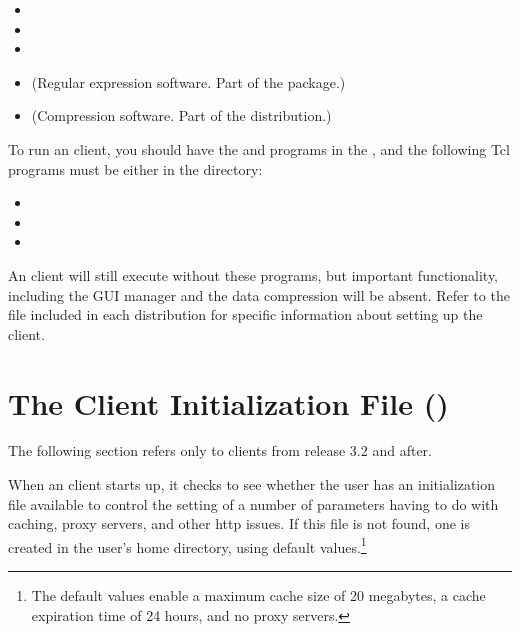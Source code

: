 \begin{itemize}

\item {}

\item {}

\item {}
  
\item {} (Regular expression software.  Part of the
   package.)

\item {} (Compression software.  Part of the 
  distribution.)

\end{itemize}

To run an \opendap client, you should have the  and 
programs in the , and the following Tcl programs must be
either in the  directory:

\begin{itemize}

\item {}

\item {}

\item {}

\end{itemize}

An \opendap client will still execute without these programs, but important
functionality, including the GUI manager and the data compression will
be absent.  Refer to the  file included in each
distribution for specific information about setting up the client.


\section{The \opendap Client Initialization File ()}

The following section refers only to \opendap clients from release 3.2 and
after. 

  
When an \opendap client starts up, it checks to
see whether the user has an initialization file available to control
the setting of a number of parameters having to do with caching, proxy
servers, and other http issues.  If this file is not found, one is
created in the user's home directory, using default
values.\footnote{The default values enable a maximum cache size of 20
  megabytes, a cache expiration time of 24 hours, and no proxy servers.}

